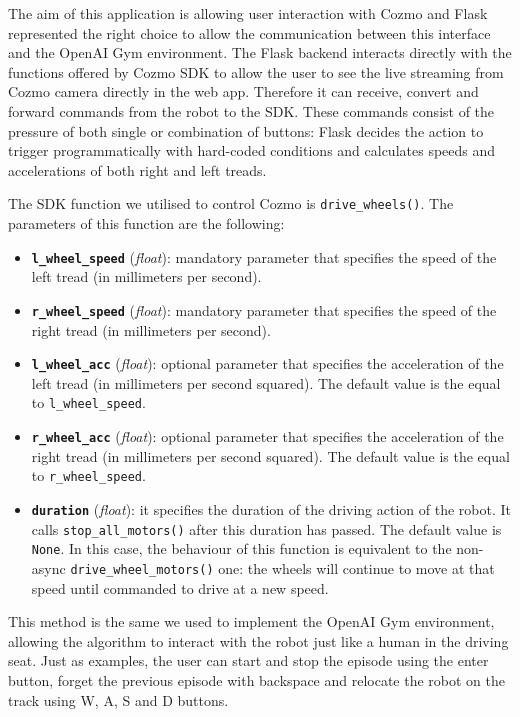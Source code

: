 The aim of this application is allowing user interaction with Cozmo and Flask represented the right choice to allow the communication between this interface and the OpenAI Gym environment.
The Flask backend interacts directly with the functions offered by Cozmo SDK to allow the user to see the live streaming from Cozmo camera directly in the web app.
Therefore it can receive, convert and forward commands from the robot to the SDK.
These commands consist of the pressure of both single or combination of buttons: Flask decides the action to trigger programmatically with hard-coded conditions and calculates speeds and accelerations of both right and left treads.

The SDK function we utilised to control Cozmo is \texttt{drive\_wheels()}.
The parameters of this function are the following:

\begin{itemize}
    \item \textbf{\texttt{l\_wheel\_speed}} (\textit{float}): mandatory parameter that specifies the speed of the left tread (in millimeters per second).
    \item \textbf{\texttt{r\_wheel\_speed}} (\textit{float}): mandatory parameter that specifies the speed of the right tread (in millimeters per second).
    \item \textbf{\texttt{l\_wheel\_acc}} (\textit{float}): optional parameter that specifies the acceleration of the left tread (in millimeters per second squared).
          The default value is the equal to \texttt{l\_wheel\_speed}.
    \item \textbf{\texttt{r\_wheel\_acc}} (\textit{float}): optional parameter that specifies the acceleration of the right tread (in millimeters per second squared).
          The default value is the equal to \texttt{r\_wheel\_speed}.
    \item \textbf{\texttt{duration}} (\textit{float}): it specifies the duration of the driving action of the robot.
          It calls \texttt{stop\_all\_motors()} after this duration has passed.
          The default value is \texttt{None}. In this case, the behaviour of this function is equivalent to the non-async \texttt{drive\_wheel\_motors()} one: the wheels will continue to move at that speed until commanded to drive at a new speed.
\end{itemize}

This method is the same we used to implement the OpenAI Gym environment, allowing the algorithm to interact with the robot just like a human in the driving seat.
Just as examples, the user can start and stop the episode using the enter button, forget the previous episode with backspace and relocate the robot on the track using W, A, S and D buttons.

